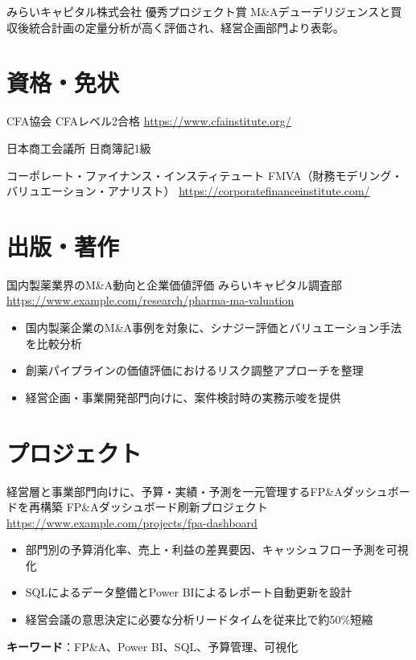\documentclass[a4paper, serif, 10pt]{moderncv}
\begin{document}
        {みらいキャピタル株式会社}
        {優秀プロジェクト賞}
        {}
        {}
        {M\&Aデューデリジェンスと買収後統合計画の定量分析が高く評価され、経営企画部門より表彰。}
\section{資格・免状}

        {CFA協会}
        {CFAレベル2合格}
        {\url{https://www.cfainstitute.org/}}
        {}
        {}

        {日本商工会議所}
        {日商簿記1級}
        {}
        {}
        {}

        {コーポレート・ファイナンス・インスティテュート}
        {FMVA（財務モデリング・バリュエーション・アナリスト）}
        {\url{https://corporatefinanceinstitute.com/}}
        {}
        {}
\section{出版・著作}

        {国内製薬業界のM\&A動向と企業価値評価}
        {みらいキャピタル調査部}
        {\url{https://www.example.com/research/pharma-ma-valuation}}
        {}
        {\begin{itemize}
\item 国内製薬企業のM\&A事例を対象に、シナジー評価とバリュエーション手法を比較分析
\item 創薬パイプラインの価値評価におけるリスク調整アプローチを整理
\item 経営企画・事業開発部門向けに、案件検討時の実務示唆を提供
\end{itemize}}
\section{プロジェクト}

        {経営層と事業部門向けに、予算・実績・予測を一元管理するFP\&Aダッシュボードを再構築}
        {FP\&Aダッシュボード刷新プロジェクト}
        {\url{https://www.example.com/projects/fpa-dashboard}}
        {}
        {\begin{itemize}
\item 部門別の予算消化率、売上・利益の差異要因、キャッシュフロー予測を可視化
\item SQLによるデータ整備とPower BIによるレポート自動更新を設計
\item 経営会議の意思決定に必要な分析リードタイムを従来比で約50\%短縮
\end{itemize}
\textbf{キーワード}：FP\&A、Power BI、SQL、予算管理、可視化}
\end{document}
